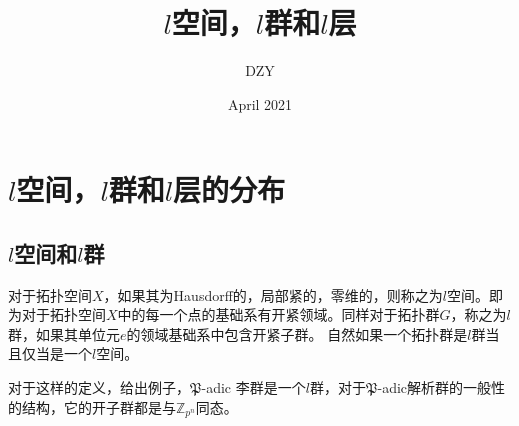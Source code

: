 \documentclass{article}
\title{$l$空间，$l$群和$l$层}
\author{DZY}
\date{April 2021}
\begin{document}
\maketitle
\section{$l$空间，$l$群和$l$层的分布}
\subsection{$l$空间和$l$群}
对于拓扑空间$X$，如果其为Hausdorff的，局部紧的，零维的，则称之为$l$空间。即为对于拓扑空间$X$中的每一个点的基础系有开紧领域。同样对于拓扑群$G$，称之为$l$群，如果其单位元$e$的领域基础系中包含开紧子群。
自然如果一个拓扑群是$l$群当且仅当是一个$l$空间。

对于这样的定义，给出例子，$\mathfrak{P}$-adic 李群是一个$l$群，对于$\mathfrak{P}$-adic解析群的一般性的结构，它的开子群都是与$\mathbb{Z}_{p^{n}}$同态。
\end{document}
